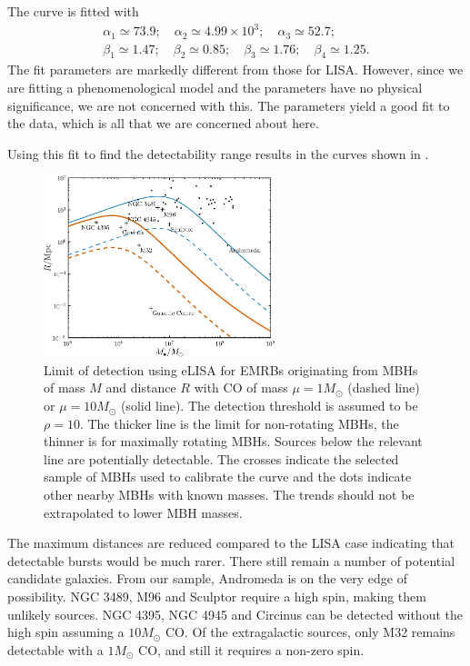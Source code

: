The curve is fitted with
\begin{equation}
\begin{array}{c}
\alpha_1 \simeq 73.9; \quad \alpha_2 \simeq 4.99 \times 10^3; \quad \alpha_3 \simeq 52.7;\\
\beta_1 \simeq 1.47; \quad\beta_2 \simeq 0.85; \quad \beta_3 \simeq 1.76; \quad \beta_4 \simeq 1.25.
\end{array}
\end{equation}
The fit parameters are markedly different from those for LISA. However, since we are fitting a phenomenological model and the parameters have no physical significance, we are not concerned with this. The parameters yield a good fit to the data, which is all that we are concerned about here.

Using this fit to find the detectability range results in the curves shown in .
\begin{figure}
\centering
 \includegraphics[width=0.6\textwidth]{./images/Fig_M_R_detect_2}
 \caption{Limit of detection using eLISA for EMRBs originating from MBHs of mass $M$ and distance $R$ with CO of mass $\mu = 1 M_\odot$ (dashed line) or $\mu = 10 M_\odot$ (solid line). The detection threshold is assumed to be $\rho = 10$. The thicker line is the limit for non-rotating MBHs, the thinner is for maximally rotating MBHs. Sources below the relevant line are potentially detectable. The crosses indicate the selected sample of MBHs used to calibrate the curve and the dots indicate other nearby MBHs with known masses. The trends should not be extrapolated to lower MBH masses.}
\label{fig:detect-eLISA}
\end{figure}
The maximum distances are reduced compared to the LISA case indicating that detectable bursts would be much rarer. There still remain a number of potential candidate galaxies. From our sample, Andromeda is on the very edge of possibility. NGC 3489, M96 and Sculptor require a high spin, making them unlikely sources. NGC 4395, NGC 4945 and Circinus can be detected without the high spin assuming a $10 M_\odot$ CO. Of the extragalactic sources, only M32 remains detectable with a $1 M_\odot$ CO, and still it requires a non-zero spin.

